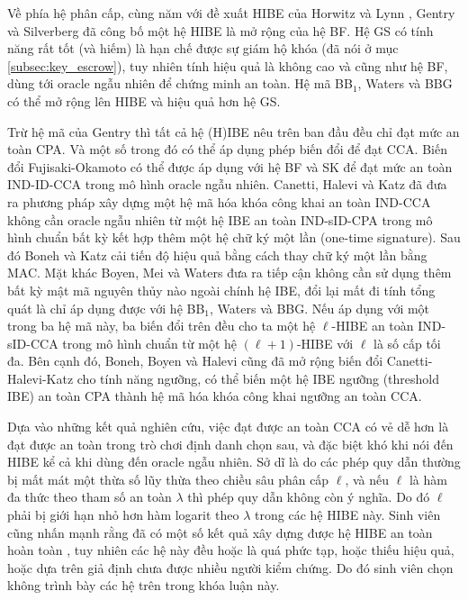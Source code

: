 \documentclass[class=report, crop=false]{standalone}
\begin{document}
		Về phía hệ phân cấp, cùng năm với đề xuất HIBE của Horwitz và Lynn \cite{DBLP:conf/eurocrypt/HorwitzL02}, Gentry và Silverberg \cite{DBLP:conf/asiacrypt/GentryS02} đã công bố một hệ HIBE là mở rộng của hệ BF. Hệ GS có tính năng rất tốt (và hiếm) là hạn chế được sự giám hộ khóa (đã nói ở mục \ref{subsec:key_escrow}), tuy nhiên tính hiệu quả là không cao và cũng như hệ BF, dùng tới oracle ngẫu nhiên để chứng minh an toàn. Hệ mã BB$_1$, Waters và BBG có thể mở rộng lên HIBE và hiệu quả hơn hệ GS.

		Trừ hệ mã của Gentry thì tất cả hệ (H)IBE nêu trên ban đầu đều chỉ đạt mức an toàn CPA. Và một số trong đó có thể áp dụng phép biến đổi để đạt CCA. Biến đổi Fujisaki-Okamoto \cite{DBLP:conf/crypto/FujisakiO99} có thể được áp dụng với hệ BF và SK để đạt mức an toàn IND-ID-CCA trong mô hình oracle ngẫu nhiên. Canetti, Halevi và Katz \cite{DBLP:conf/eurocrypt/CanettiHK04} đã đưa ra phương pháp xây dựng một hệ mã hóa khóa công khai an toàn IND-CCA không cần oracle ngẫu nhiên từ một hệ IBE an toàn IND-sID-CPA trong mô hình chuẩn bất kỳ kết hợp thêm một hệ chữ ký một lần (one-time signature). Sau đó Boneh và Katz \cite{DBLP:conf/ctrsa/BonehK05} cải tiến độ hiệu quả bằng cách thay chữ ký một lần bằng MAC. Mặt khác Boyen, Mei và Waters \cite{DBLP:conf/ccs/BoyenMW05} đưa ra tiếp cận không cần sử dụng thêm bất kỳ mật mã nguyên thủy nào ngoài chính hệ IBE, đổi lại mất đi tính tổng quát là chỉ áp dụng được với hệ BB$_1$, Waters và BBG. Nếu áp dụng với một trong ba hệ mã này, ba biến đổi trên đều cho ta một hệ $\ell$-HIBE an toàn IND-sID-CCA trong mô hình chuẩn từ một hệ $(\ell + 1)$-HIBE với $\ell$ là số cấp tối đa. Bên cạnh đó, Boneh, Boyen và Halevi \cite{DBLP:conf/ctrsa/BonehBH06} cũng đã mở rộng biến đổi Canetti-Halevi-Katz cho tính năng ngưỡng, có thể biến một hệ IBE ngưỡng (threshold IBE) an toàn CPA thành hệ mã hóa khóa công khai ngưỡng an toàn CCA.

		Dựa vào những kết quả nghiên cứu, việc đạt được an toàn CCA có vẻ dễ hơn là đạt được an toàn trong trò chơi định danh chọn sau, và đặc biệt khó khi nói đến HIBE kể cả khi dùng đến oracle ngẫu nhiên. Sở dĩ là do các phép quy dẫn thường bị mất mát một thừa số lũy thừa theo chiều sâu phân cấp $\ell$, và nếu $\ell$ là hàm đa thức theo tham số an toàn $\lambda$ thì phép quy dẫn không còn ý nghĩa. Do đó $\ell$ phải bị giới hạn nhỏ hơn hàm logarit theo $\lambda$ trong các hệ HIBE này. Sinh viên cũng nhấn mạnh rằng đã có một số kết quả xây dựng được hệ HIBE an toàn hoàn toàn \cite{DBLP:conf/tcc/GentryH09, DBLP:conf/crypto/Waters09, DBLP:conf/tcc/LewkoW10, DBLP:journals/jise/HuWXY14}, tuy nhiên các hệ này đều hoặc là quá phức tạp, hoặc thiếu hiệu quả, hoặc dựa trên giả định chưa được nhiều người kiểm chứng. Do đó sinh viên chọn không trình bày các hệ trên trong khóa luận này.
		
\end{document}
